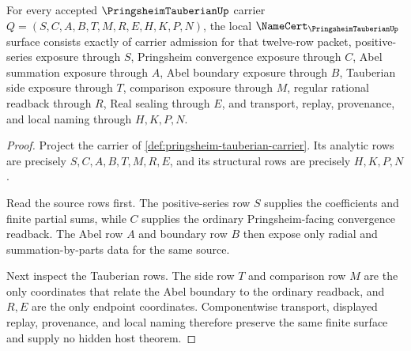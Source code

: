 \begin{theorem}
\label{thm:pringsheim-tauberian-namecert-obligations}
For every accepted $\PringsheimTauberianUp$ carrier $Q=(S,C,A,B,T,M,R,E,H,K,P,N)$, the local $\NameCert_{\PringsheimTauberianUp}$ surface consists exactly of carrier admission for that twelve-row packet, positive-series exposure through $S$, Pringsheim convergence exposure through $C$, Abel summation exposure through $A$, Abel boundary exposure through $B$, Tauberian side exposure through $T$, comparison exposure through $M$, regular rational readback through $R$, Real sealing through $E$, and transport, replay, provenance, and local naming through $H,K,P,N$.
\end{theorem}
\begin{proof}
Project the carrier of \autoref{def:pringsheim-tauberian-carrier}. Its analytic rows are precisely $S,C,A,B,T,M,R,E$, and its structural rows are precisely $H,K,P,N$.

Read the source rows first. The positive-series row $S$ supplies the coefficients and finite partial sums, while $C$ supplies the ordinary Pringsheim-facing convergence readback. The Abel row $A$ and boundary row $B$ then expose only radial and summation-by-parts data for the same source.

Next inspect the Tauberian rows. The side row $T$ and comparison row $M$ are the only coordinates that relate the Abel boundary to the ordinary readback, and $R,E$ are the only endpoint coordinates. Componentwise transport, displayed replay, provenance, and local naming therefore preserve the same finite surface and supply no hidden host theorem.
\end{proof}

